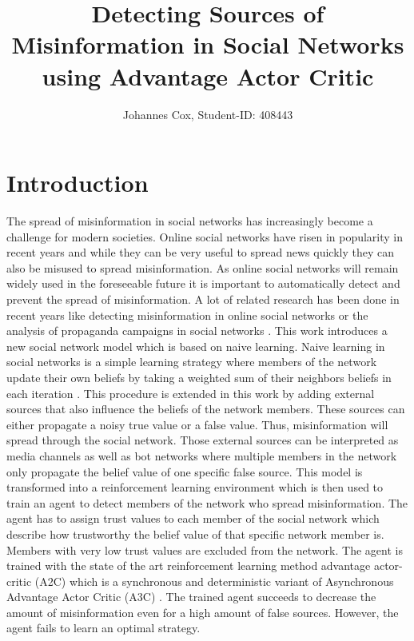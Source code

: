 \documentclass[11pt, a4paper]{article}
\title{Detecting Sources of Misinformation in Social Networks using Advantage Actor Critic}
\author{Johannes Cox, Student-ID: 408443}
\begin{document}
	
\maketitle

\section{Introduction}
The spread of misinformation in social networks has increasingly become a challenge for modern societies. Online social networks have risen in popularity in recent years and while they can be very useful to spread news quickly they can also be misused to spread misinformation. As online social networks will remain widely used in the foreseeable future it is important to automatically detect and prevent the spread of misinformation. A lot of related research has been done in recent years like detecting misinformation in online social networks \cite{DetectMisinformation1, DetectMisinformation2, DetectMisinformation3, DetectMisinformation4} or the analysis of propaganda campaigns in social networks \cite{PropagandaAnalysis1, PropagandaAnalysis2, PropagandaAnalysis3}.\newline
This work introduces a new social network model which is based on naive learning. Naive learning in social networks is a simple learning strategy where members of the network update their own beliefs by taking a weighted sum of their neighbors beliefs in each iteration \cite{NaiveLearning1,NaiveLearning2,NaiveLearning3}. This procedure is extended in this work by adding external sources that also influence the beliefs of the network members. These sources can either propagate a noisy true value or a false value. Thus, misinformation will spread through the social network. Those external sources can be interpreted as media channels as well as bot networks where multiple members in the network only propagate the belief value of one specific false source. This model is transformed into a reinforcement learning environment which is then used to train an agent to detect members of the network who spread misinformation. The agent has to assign trust values to each member of the social network which describe how trustworthy the belief value of that specific network member is. Members with very low trust values are excluded from the network. The agent is trained with the state of the art reinforcement learning method advantage actor-critic (A2C) \cite{A2C_1, A2C_3} which is a synchronous and deterministic variant of Asynchronous Advantage Actor Critic (A3C) \cite{A3C_1}. The trained agent succeeds to decrease the amount of misinformation even for a high amount of false sources. However, the agent fails to learn an optimal strategy.\newline
\end{document}
